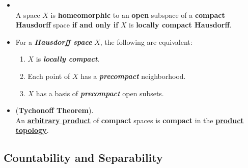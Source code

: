 \documentclass[11pt]{article}
\begin{document}
\begin{itemize}
\item \begin{corollary}  \citep{munkres2000topology} \\
A space $X$ is \textbf{homeomorphic} to an \textbf{open} subspace of a \textbf{compact Hausdorff} space \textbf{if and only if} $X$ is \textbf{locally compact Hausdorff}.
\end{corollary}

\item For a \emph{\textbf{Hausdorff space}} $X$,  the following are equivalent:
\begin{enumerate}
\item $X$ is \emph{\textbf{locally compact}}.
\item Each point of $X$ has a \emph{\textbf{precompact}} neighborhood. 
\item $X$ has a basis of \emph{\textbf{precompact}} open subsets.
\end{enumerate}

\item \begin{theorem} (\textbf{Tychonoff Theorem}). \citep{munkres2000topology} \\
 An \underline{\textbf{arbitrary product}} of \textbf{compact} spaces is \textbf{compact} in the \underline{\textbf{product topology}}.
\end{theorem}
\end{itemize}

\subsection{Countability and Separability}
\end{document}
